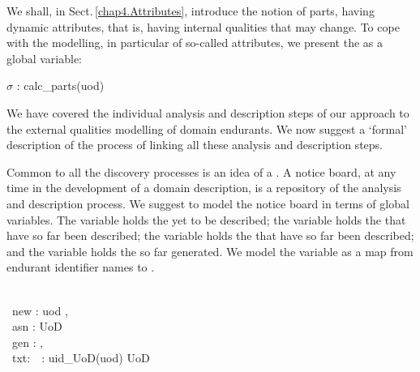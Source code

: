 \label{kap3.States.specific}

\begynd
\pind We shall, in Sect.\,\ref{chap4.Attributes}, introduce the notion of parts,
\begynd
\pind having dynamic attributes,
\pind that is, having internal qualities that may change.
\afslut
\pind To cope with the modelling, 
\pind in particular of so-called  attributes,
\pind we present the  as a global variable:
\afslut


\bp
{} $\sigma$ :{\EQ} calc\_parts({\LBRACE}uod{\RBRACE})
\ep


\label{External Analysis and Description Procedure}

\begynd
\pind We have covered 
\begynd
\pind the individual analysis and description steps
\pind of our approach to the external qualities modelling 
\pind of domain endurants. 
\afslut
\pind We now suggest
\begynd 
\pind a `formal' description of the process
\pind of linking all these analysis and description steps.
\afslut
\afslut

\label{A Description State}\label{ADomainDiscoveryNoticeBoard}

\begynd
\pind Common to all the discovery processes is an idea of a
      . 
\pind A notice board, at any time in the development of a domain
      description,  is a repository of the analysis and description process. 
\pind We suggest to model the notice board in terms of  global
      variables.
\begynd
\pind The  variable holds the  yet to be described;
\pind the  variable holds the  that have so far been
      described;
\pind the  variable holds the  that have so far been
      described; and
\pind the  variable holds the \bmcolor{\rsltxt} so far generated.
\begynd
\pind We model  the  variable as a  map 
\pind from endurant identifier names to \bmcolor{\rsltxt}.
\afslut
\afslut
\afslut\HHHH
\pos{\psno}{\mnewfoil}

\vspace*{2mm}

\label{DiscoverySchema0}\label{A Domain Discovery Notice Board}
\bp
{}\\
\>\ new :{\EQ} {\LBRACE}uod{\RBRACE} ,\\
\>\ asn :{\EQ} {\LBRACE} \bq UoD \eq {\RBRACE}\\
\>\ gen :{\EQ} {\LBRACE}{\RBRACE} ,\\
\>\ txt:\rsltxt\ \ :{\EQ} {\LBRACKET} uid\_UoD(uod) {\MAPSTO} {\LANGLE}\bq{} UoD\eq{\RANGLE} {\RBRACKET}
\ep
\endboiteepaisseavecuntitre\pos{\normalsize}{\HHHH}\rm


